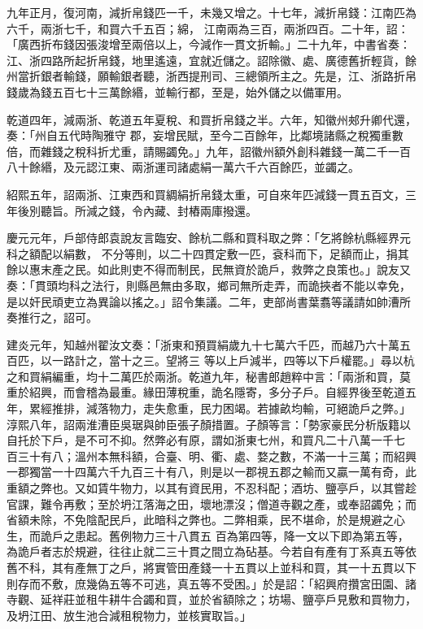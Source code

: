 \begin{pinyinscope}
 九年正月，復河南，減折帛錢匹一千，未幾又增之。十七年，減折帛錢：江南匹為六千，兩浙七千，和買六千五百；綿，
 江南兩為三百，兩浙四百。二十年，詔：「廣西折布錢因張浚增至兩倍以上，今減作一貫文折輸。」二十九年，中書省奏：江、浙四路所起折帛錢，地里遙遠，宜就近儲之。詔除徽、處、廣德舊折輕貨，餘州當折銀者輸錢，願輸銀者聽，浙西提刑司、三總領所主之。先是，江、浙路折帛錢歲為錢五百七十三萬餘緡，並輸行都，至是，始外儲之以備軍用。



 乾道四年，減兩浙、乾道五年夏稅、和買折帛錢之半。六年，知徽州郟升卿代還，奏：「州自五代時陶雅守
 郡，妄增民賦，至今二百餘年，比鄰境諸縣之稅獨重數倍，而雜錢之稅科折尤重，請賜蠲免。」九年，詔徽州額外創科雜錢一萬二千一百八十餘緡，及元認江東、兩浙運司諸處絹一萬六千六百餘匹，並蠲之。



 紹熙五年，詔兩浙、江東西和買綢絹折帛錢太重，可自來年匹減錢一貫五百文，三年後別聽旨。所減之錢，令內藏、封樁兩庫撥還。



 慶元元年，戶部侍郎袁說友言臨安、餘杭二縣和買科取之弊：「乞將餘杭縣經界元科之額配以絹數，
 不分等則，以二十四貫定敷一匹，袞科而下，足額而止，捐其餘以惠末產之民。如此則吏不得而制民，民無資於詭戶，救弊之良策也。」說友又奏：「貫頭均科之法行，則縣邑無由多取，鄉司無所走弄，而詭挾者不能以幸免，是以奸民頑吏立為異論以搖之。」詔令集議。二年，吏部尚書葉翥等議請如帥漕所奏推行之，詔可。



 建炎元年，知越州翟汝文奏：「浙東和預買絹歲九十七萬六千匹，而越乃六十萬五百匹，以一路計之，當十之三。望將三
 等以上戶減半，四等以下戶權罷。」尋以杭之和買絹編重，均十二萬匹於兩浙。乾道九年，秘書郎趙粹中言：「兩浙和買，莫重於紹興，而會稽為最重。緣田薄稅重，詭名隱寄，多分子戶。自經界後至乾道五年，累經推排，減落物力，走失愈重，民力困竭。若據畝均輸，可絕詭戶之弊。」淳熙八年，詔兩淮漕臣吳琚與帥臣張子顏措置。子顏等言：「勢家豪民分析版籍以自托於下戶，是不可不抑。然弊必有原，謂如浙東七州，和買凡二十八萬一千七
 百三十有八；溫州本無科額，合臺、明、衢、處、婺之數，不滿一十三萬；而紹興一郡獨當一十四萬六千九百三十有八，則是以一郡視五郡之輸而又贏一萬有奇，此重額之弊也。又如賃牛物力，以其有資民用，不忍科配；酒坊、鹽亭戶，以其嘗趁官課，難令再敷；至於坍江落海之田，壞地漂沒；僧道寺觀之產，或奉詔蠲免；而省額未除，不免陰配民戶，此暗科之弊也。二弊相乘，民不堪命，於是規避之心生，而詭戶之患起。舊例物力三十八貫五
 百為第四等，降一文以下即為第五等，為詭戶者志於規避，往往止就二三十貫之間立為砧基。今若自有產有丁系真五等依舊不科，其有產無丁之戶，將實管田產錢一十五貫以上並科和買，其一十五貫以下則存而不敷，庶幾偽五等不可逃，真五等不受困。」於是詔：「紹興府攢宮田園、諸寺觀、延祥莊並租牛耕牛合蠲和買，並於省額除之；坊場、鹽亭戶見敷和買物力，及坍江田、放生池合減租稅物力，並核實取旨。」




\end{pinyinscope}
